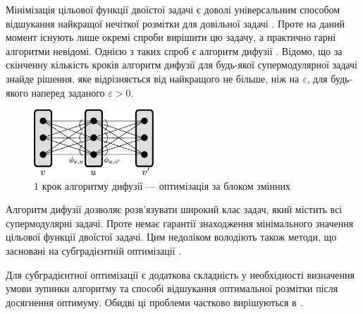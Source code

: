 Мінімізація цільової функції двоїстої задачі є доволі універсальним способом відшукання найкращої
нечіткої розмітки для довільної задачі \cite{diffusion_shlezinger,savchynskyy,SchlGig_1_usim2007}. Проте на даний момент існують лише окремі спроби вирішити цю задачу,
а практично гарні алгоритми невідомі.
Однією з таких спроб є алгоритм дифузії \cite{diffusion_shlezinger, savchynskyy}.
Відомо, що за скінченну кількість кроків алгоритм дифузії для будь-якої супермодулярної задачі
знайде рішення, яке відрізняється від найкращого не більше, ніж на $\varepsilon$,
для будь-якого наперед заданого $\varepsilon>0$.

\begin{figure}[h]
  \centering
  \includegraphics[width=0.4\textwidth]{images/One-elementary-step-of_diffusion.png}
  \caption{1 крок алгоритму дифузії --- оптимізація за блоком змінних \cite{ishikawa}}
  \label{fig:graph_example}
\end{figure}

Алгоритм дифузії дозволяє розв'язувати широкий клас задач, який містить всі
супермодулярні задачі. Проте немає гарантії знаходження мінімального
значення цільової функції двоїстої задачі. Цим недоліком володіють також
методи, що засновані на субградієнтній оптимізації \cite{Shor1985}.

Для субградієнтної оптимізації є додаткова складність у необхідності визначення
умови зупинки алгоритму та способі відшукання оптимальної розмітки
після досягнення оптимуму. Обидві ці проблеми частково вирішуються в \cite{lopatka_stop_cond}.



